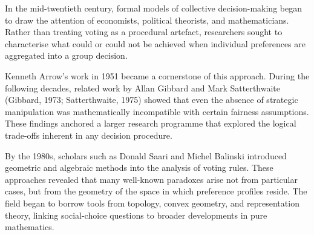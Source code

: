 \begin{historical}
In the mid-twentieth century, formal models of collective decision-making began to draw the attention of economists, political theorists, and mathematicians. Rather than treating voting as a procedural artefact, researchers sought to characterise what could or could not be achieved when individual preferences are aggregated into a group decision.

Kenneth Arrow’s work in 1951 became a cornerstone of this approach. During the following decades, related work by Allan Gibbard and Mark Satterthwaite (Gibbard, 1973; Satterthwaite, 1975) showed that even the absence of strategic manipulation was mathematically incompatible with certain fairness assumptions. These findings anchored a larger research programme that explored the logical trade-offs inherent in any decision procedure.

By the 1980s, scholars such as Donald Saari and Michel Balinski introduced geometric and algebraic methods into the analysis of voting rules. These approaches revealed that many well-known paradoxes arise not from particular cases, but from the geometry of the space in which preference profiles reside. The field began to borrow tools from topology, convex geometry, and representation theory, linking social-choice questions to broader developments in pure mathematics.
\end{historical}
